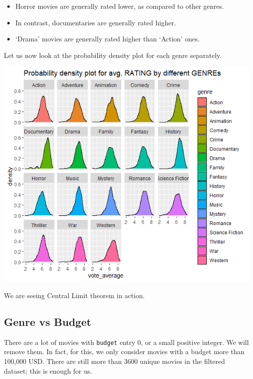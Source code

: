 \documentclass[10pt]{article}
\begin{document}
\begin{multicols}{2}
\begin{itemize}
    \item Horror movies are generally rated lower, as compared to other genres.
    \item In contrast, documentaries are generally rated higher.
    \item `Drama' movies are generally rated higher than `Action' ones.
\end{itemize}

Let us now look at the probability density plot for each genre separately.

\includegraphics[scale=0.5]{density_rating_genres.png}

We are seeing Central Limit theorem in action. 

\subsection{Genre vs Budget}

There are a lot of movies with \texttt{budget} entry 0, or a small positive integer. 
We will remove them. In fact, for this, we only consider movies with a budget more than 100,000 USD. 
There are still more than 3600 unique movies in the filtered dataset; this is enough for us.


\end{multicols}
\end{document}
